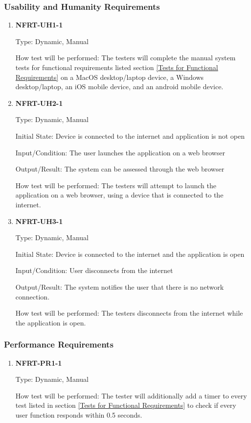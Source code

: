 \documentclass[12pt, titlepage]{article}
\begin{document}
\subsubsection{Usability and Humanity Requirements}
\begin{enumerate}

	\item \textbf{NFRT-UH1-1} %

	      Type: Dynamic, Manual

	      How test will be performed: The testers will complete the manual system tests for functional
	      requirements listed section \ref{Tests for Functional Requirements} on a MacOS desktop/laptop
	      device, a Windows desktop/laptop, an iOS mobile device, and an android mobile device.

	\item \textbf{NFRT-UH2-1} %

	      Type: Dynamic, Manual

	      Initial State: Device is connected to the internet and application is not open

	      Input/Condition: The user launches the application on a web browser

	      Output/Result: The system can be assessed through the web browser

	      How test will be performed: The testers will attempt to launch the application on a web browser,
	      using a device that is connected to the internet.

	\item \textbf{NFRT-UH3-1} %

	      Type: Dynamic, Manual

	      Initial State: Device is connected to the internet and the application is open

	      Input/Condition: User disconnects from the internet

	      Output/Result: The system notifies the user that there is no network connection.

	      How test will be performed: The testers disconnects from the internet while the application is
	      open.

\end{enumerate}

\subsubsection{Performance Requirements}
\begin{enumerate}
	\item \textbf{NFRT-PR1-1} %

	      Type: Dynamic, Manual

	      How test will be performed: The tester will additionally add a timer to every test listed in
	      section \ref{Tests for Functional Requirements} to check if every user function responds within 0.5
	      seconds.

\end{enumerate}
\end{document}
